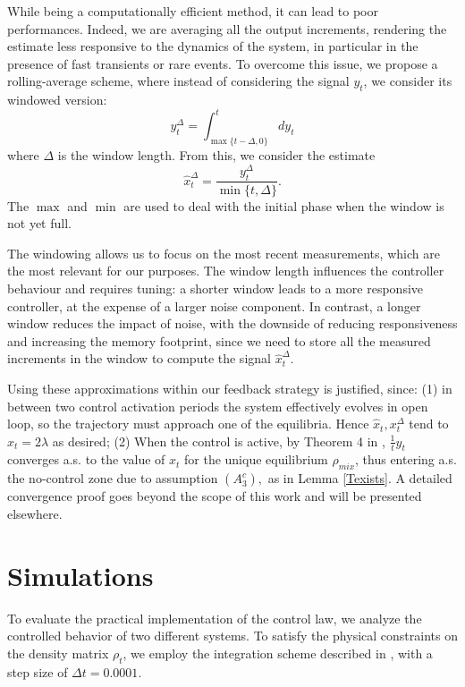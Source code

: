 \documentclass[conference]{IEEEtran}
\theoremstyle{plain}
\theoremstyle{plain}
\theoremstyle{plain}
\theoremstyle{plain}
\theoremstyle{remark}
\theoremstyle{definition}
\begin{document}
While being a computationally efficient method, it can lead to poor performances. Indeed, we are averaging all the output increments, rendering the estimate less responsive to the dynamics of the system, in particular in the presence of fast transients or rare events. To overcome this issue, we propose a rolling-average scheme, where instead of considering the signal $y_t$, we consider its windowed version: \begin{equation}\label{eq:window}
    y^{\Delta}_t = \int_{\max\{t - \Delta, 0\}}^t dy_t
\end{equation}
where $\Delta$ is the window length. From this, we consider the estimate \begin{equation}
    \hat x^\Delta_t = \frac{y^\Delta_t}{\min\{t, \Delta\}}.
\end{equation}
The $\max$ and $\min$ are used to deal with the initial phase when the window is not yet full.

The windowing allows us to focus on the most recent measurements, which are the most relevant for our purposes. The window length influences the controller behaviour and requires tuning: a shorter window leads to a more responsive controller, at the expense of a larger noise component. In contrast, a longer window reduces the impact of noise, with the downside of reducing responsiveness and increasing the memory footprint, since we need to store all the measured increments in the window to compute the signal $\hat x^\Delta_t$. 

Using these approximations within our feedback strategy is justified, since: (1) in between two control activation periods the system effectively evolves in open loop, so the trajectory must approach one of the equilibria. Hence $\hat x_t, x^\Delta_t$ tend to $x_t=2\lambda$ as desired; (2) When the control is active, by Theorem 4 in \cite{ergmean}, $\frac{1}{t}y_t$ converges a.s. to the value of $x_t$ for the unique equilibrium $\rho_{mix}$, thus entering a.s. the no-control zone due to assumption $(A_3^c),$ as in Lemma \ref{Texists}. A detailed convergence proof goes beyond the scope of this work and will be presented elsewhere.

\section{Simulations}
To evaluate the practical implementation of the control law, we analyze the controlled behavior of two different systems. To satisfy the physical constraints on the density matrix $\rho_t$, we employ the integration scheme described in \cite{rouchon}, with a step size of $\Delta t = 0.0001$.
\end{document}

